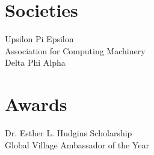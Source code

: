 \documentclass[letterpaper]{deedy-resume} %
\begin{document}
\begin{minipage}[t]{0.33\textwidth}
\section{Societies}
Upsilon Pi Epsilon \\
Association for Computing Machinery \\
Delta Phi Alpha
\section{Awards}
Dr. Esther L. Hudgins Scholarship \\
Global Village Ambassador of the Year

\end{minipage} %
\hfill
%
%
\end{document}
